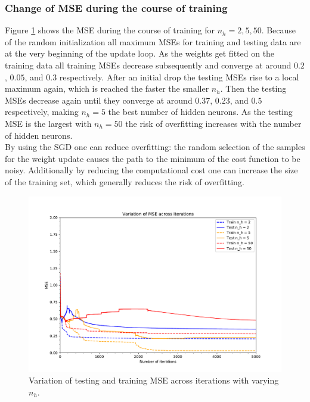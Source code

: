 \documentclass{article}
\begin{document}
\subsubsection{Change of MSE during the course of training}

Figure \ref{1_1_d_mse} shows the MSE during the course of training for $n_h=2,5,50$. Because of the random initialization all maximum MSEs for training and testing data are at the very beginning of the update loop. As the weights get fitted on the training data all training MSEs decrease subsequently and converge at around $0.2$, $0.05$, and $0.3$ respectively. After an initial drop the testing MSEs rise to a local maximum again, which is reached the faster the smaller $n_h$. Then the testing MSEs decrease again until they converge at around $0.37$, $0.23$, and $0.5$ respectively, making $n_h=5$ the best number of hidden neurons. As the testing MSE is the largest with $n_h=50$ the risk of overfitting increases with the number of hidden neurons.\\
By using the SGD one can reduce overfitting: the random selection of the samples for the weight update causes the path to the minimum of the cost function to be noisy. Additionally by reducing the computational cost one can increase the size of the training set, which generally reduces the risk of overfitting.

\begin{figure}[!ht]
\centering
\includegraphics[width=\textwidth]{./Figures/1_1_d_mse.pdf}
\caption{Variation of testing and training MSE across iterations with varying $n_h$.}
\label{1_1_d_mse}
\end{figure}
\end{document}
